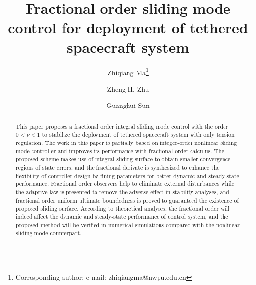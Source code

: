 \documentclass[ShortAfour]{sage}
\theoremstyle{plain}
\theoremstyle{remark}
\begin{document}
 



\title{ Fractional order sliding mode control for deployment of tethered spacecraft system}

\author{Zhiqiang Ma\thanks{Corresponding author;
e-mail: zhiqiangma@nwpu.edu.cn}}

\address{National Key Laboratory of Aerospace Flight Dynamics and Research Center for Intelligent Robotics, School of Astronautics, Northwestern Polytechnical University, Xi'an 710072, China}

\author{Zheng H. Zhu} 

\address{Department of Mechanical Engineering, York University, Toronto, Ontario M3J 1P3, Canada}

\author{Guanghui Sun}

\address{Research Institute of Intelligent Control and Systems, Harbin Institute of Technology, Harbin 150001, China}



\maketitle

\begin{abstract}
  This paper proposes a fractional order integral sliding mode control with the order $0<\nu<1$ to stabilize the deployment of tethered spacecraft system with only tension regulation. 
  The work in this paper is partially based on integer-order nonlinear sliding mode controller and improves its performance with fractional order calculus. 
  The proposed scheme makes use of integral sliding surface to obtain smaller convergence regions of state errors, and the fractional derivate is synthesized to enhance the flexibility of controller design by fining parameters for better dynamic and steady-state performance. 
  Fractional order observers help to eliminate external disturbances while the adaptive law is presented to remove the adverse effect in stability analyses, and fractional order uniform ultimate boundedness is proved to guaranteed the existence of proposed sliding surface. According to theoretical analyses, the fractional order will indeed affect the dynamic and steady-state performance of control system, and the proposed method will be verified in numerical simulations compared with the nonlinear sliding mode counterpart.
\end{abstract}
\end{document}
